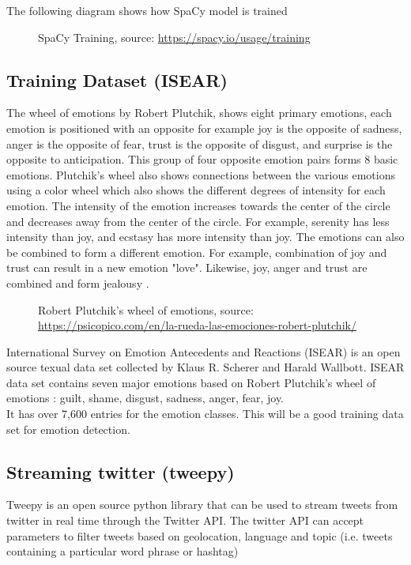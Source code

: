 The following diagram shows how SpaCy model is trained

\begin{figure}[h]
  \centering
  \caption[SpaCy Training]%
  {SpaCy Training, source: \url{https://spacy.io/usage/training}}
  \label{fig:ALAP:sm3}
\end{figure}
 

\subsection{Training Dataset (ISEAR)}

The wheel of emotions by Robert Plutchik, shows eight primary emotions, each emotion is positioned with an opposite for example joy is the opposite of sadness, anger is the opposite of fear, trust is the opposite of disgust, and surprise is the opposite to anticipation. This group of four opposite emotion pairs forms 8 basic emotions. Plutchik's wheel also shows connections between the various emotions using a color wheel which also shows the different degrees of intensity for each emotion. The intensity of the emotion increases towards the center of the circle and decreases away from the center of the circle. For example, serenity has less intensity than joy, and ecstasy has more intensity than joy. The emotions can also be combined to form a different emotion. For example, combination of joy and trust can result in a new emotion "love". Likewise, joy, anger and trust are combined and form jealousy \cite{ref4}.

\begin{figure}[h]
  \centering
  \caption[Robert Plutchik's wheel of emotions]%
  {Robert Plutchik's wheel of emotions, source: \url{https://psicopico.com/en/la-rueda-las-emociones-robert-plutchik/}}
  \label{fig:ALAP:sm3}
\end{figure}

International Survey on Emotion Antecedents and Reactions (ISEAR) is an open source texual data set collected by Klaus R. Scherer and Harald Wallbott. 
ISEAR data set contains seven major emotions based on Robert Plutchik's wheel of emotions : guilt, shame, disgust, sadness, anger, fear,  joy.\\
It has over 7,600 entries for the emotion classes. This will be a good training data set for emotion detection.
\clearpage

\subsection{Streaming twitter (tweepy)}
Tweepy is an open source python library that can be used to stream tweets from twitter in real time through the Twitter API. The twitter API can accept parameters to filter tweets based on geolocation, language and topic (i.e. tweets containing a particular word phrase or hashtag)


